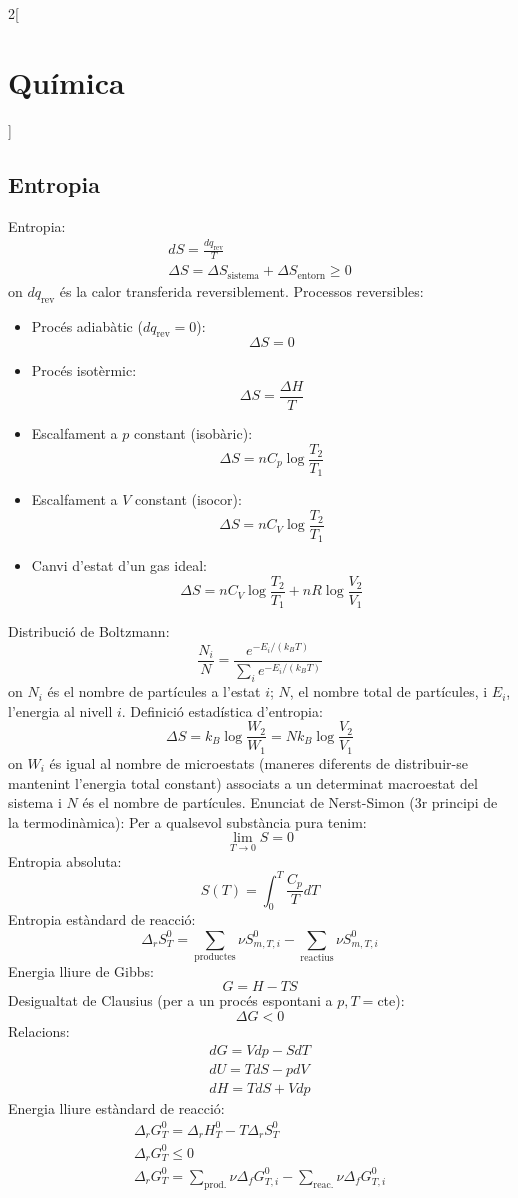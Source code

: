 \documentclass[class=article,10pt,crop=false]{standalone}
\begin{document}
\begin{multicols}{2}[\section{Química}]
\subsection{Entropia}
Entropia:
\begin{gather*}
    dS=\frac{dq_\text{rev}}{T}\\
    \Delta S=\Delta S_{\text{sistema}}+\Delta S_{\text{entorn}}\geq 0
\end{gather*} {\footnotesize on $dq_\text{rev}$ és la calor transferida reversiblement.}\newline
Processos reversibles:
\begin{itemize}
    \item Procés adiabàtic ($dq_\text{rev}=0$):$$\Delta S=0$$
    \item Procés isotèrmic: $$\Delta S=\frac{\Delta H}{T}$$
    \item Escalfament a $p$ constant (isobàric): $$\Delta S=nC_p\log\frac{T_2}{T_1}$$
    \item Escalfament a $V$ constant (isocor): $$\Delta S=nC_V\log\frac{T_2}{T_1}$$
    \item Canvi d'estat d'un gas ideal: $$\Delta S=nC_V\log\frac{T_2}{T_1}+nR\log\frac{V_2}{V_1}$$
\end{itemize}
Distribució de Boltzmann: $$\frac{N_i}{N}=\frac{e^{-E_i/(k_BT)}}{\sum_ie^{-E_i/(k_BT)}}$$ {\footnotesize on $N_i$ és el nombre de partícules a l'estat $i$; $N$, el nombre total de partícules, i $E_i$, l'energia al nivell $i$.}\newline
Definició estadística d'entropia: $$\Delta S=k_B\log\frac{W_2}{W_1}=Nk_B\log\frac{V_2}{V_1}$$ {\footnotesize on $W_i$ és igual al nombre de microestats (maneres diferents de distribuir-se mantenint l’energia total constant) associats a un determinat macroestat del sistema i $N$ és el nombre de partícules.}\newline
Enunciat de Nerst-Simon (3r principi de la termodinàmica): Per a qualsevol substància pura tenim: $$\lim_{T\to0}S=0$$
Entropia absoluta: $$S(T)=\int_0^T\frac{C_p}{T}dT$$
Entropia estàndard de reacció: $$\Delta_rS_T^0=\sum_{\text{productes}}\nu S_{m,T,i}^0-\sum_{\text{reactius}}\nu S_{m,T,i}^0$$
Energia lliure de Gibbs: $$G=H-TS$$
Desigualtat de Clausius (per a un procés espontani a $p,T=$cte): $$\Delta G<0$$
Relacions:
\begin{gather*}
    dG=Vdp-SdT\\
    dU=TdS-pdV\\
    dH=TdS+Vdp
\end{gather*}
Energia lliure estàndard de reacció: \begin{gather*}
    \Delta_rG_T^0=\Delta_rH_T^0-T\Delta_rS_T^0\\
    \Delta_rG_T^0\leq 0\\
    \Delta_rG_T^0=\sum_{\text{prod.}}\nu\Delta_fG_{T,i}^0-\sum_{\text{reac.}}\nu\Delta_fG_{T,i}^0
\end{gather*}

\end{multicols}
\end{document}
